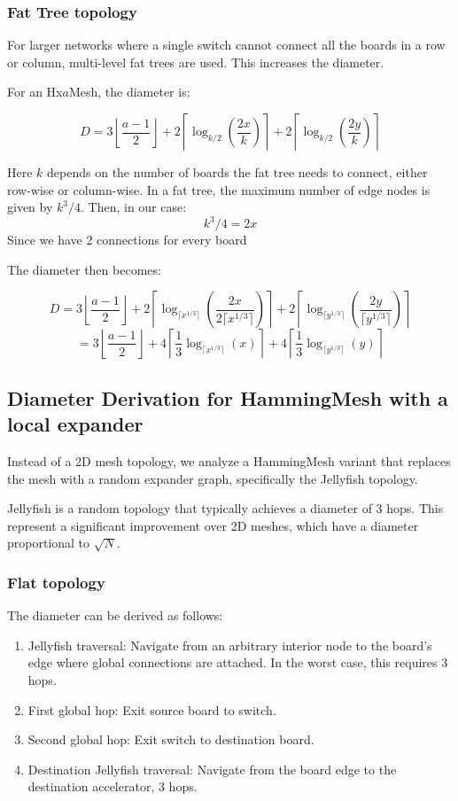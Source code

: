 \documentclass{article}
\begin{document}
\subsubsection{Fat Tree topology}
For larger networks where a single switch cannot connect all the boards in a row or column, multi-level fat trees are used. This increases the diameter.

For an Hx\(a\)Mesh, the diameter is:

\[D =
3\left\lfloor \frac{a-1}{2} \right\rfloor
+ 2\left\lceil \log_{k/2}\!\left(\frac{2x}{k}\right) \right\rceil
+ 2\left\lceil \log_{k/2}\!\left(\frac{2y}{k}\right) \right\rceil
\]

Here \(k\) depends on the number of boards the fat tree needs to connect, either row-wise or column-wise.
In a fat tree, the maximum number of edge nodes is given by \(k^3/4\). Then, in our case:
\[
k^3/4 = 2x
\]
Since we have 2 connections for every board

The diameter then becomes:

\[D =
3\left\lfloor \frac{a-1}{2} \right\rfloor
+ 2\left\lceil \log_{\lceil x^{1/3}\rceil}\!\left(\frac{2x}{2\lceil x^{1/3}\rceil}\right) \right\rceil
+ 2\left\lceil \log_{\lceil y^{1/3}\rceil}\!\left(\frac{2y}{\lceil y^{1/3}\rceil}\right) \right\rceil
\]
\[=
3\left\lfloor \frac{a-1}{2} \right\rfloor
+ 4\left\lceil \frac{1}{3}\log_{\lceil x^{1/3}\rceil}\!\left(x\right) \right\rceil
+ 4\left\lceil \frac{1}{3}\log_{\lceil y^{1/3}\rceil}\!\left(y\right) \right\rceil
\]

\subsection{Diameter Derivation for HammingMesh with a local expander}
Instead of a 2D mesh topology, we analyze a HammingMesh variant that replaces the mesh with a random expander graph, specifically the Jellyfish topology.

Jellyfish is a random topology that typically achieves a diameter of 3 hops. \cite{Singla2012}
This represent a significant improvement over 2D meshes, which have a diameter proportional to \(\sqrt{N}\).

\subsubsection{Flat topology}
The diameter can be derived as follows:
\begin{enumerate}
    \item Jellyfish traversal: Navigate from an
    arbitrary interior node to the board's edge where global connections
    are attached. In the worst case, this requires 3 hops.
    \item First global hop: Exit source board to switch.
    \item Second global hop: Exit switch to destination board.
    \item Destination Jellyfish traversal: Navigate from
    the board edge to the destination accelerator, 3 hops.
\end{enumerate}
\end{document}
